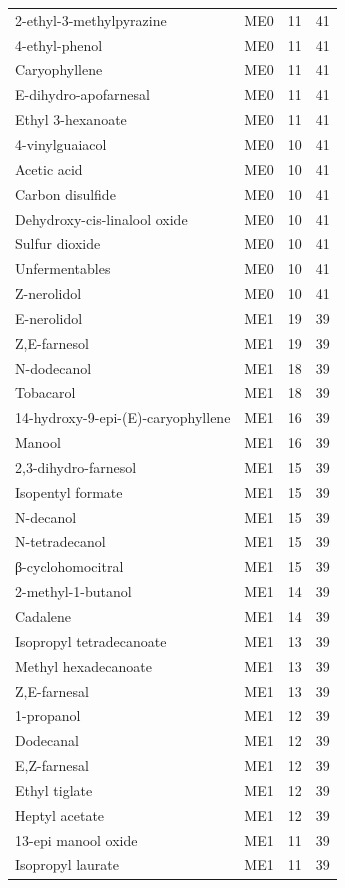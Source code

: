 {\begin{longtable}{lrrr}
2-ethyl-3-methylpyrazine & ME0 & 11 & 41 \\
4-ethyl-phenol & ME0 & 11 & 41 \\
Caryophyllene & ME0 & 11 & 41 \\
E-dihydro-apofarnesal & ME0 & 11 & 41 \\
Ethyl 3-hexanoate & ME0 & 11 & 41 \\
4-vinylguaiacol & ME0 & 10 & 41 \\
Acetic acid & ME0 & 10 & 41 \\
Carbon disulfide & ME0 & 10 & 41 \\
Dehydroxy-cis-linalool oxide & ME0 & 10 & 41 \\
Sulfur dioxide & ME0 & 10 & 41 \\
Unfermentables & ME0 & 10 & 41 \\
Z-nerolidol & ME0 & 10 & 41 \\
E-nerolidol & ME1 & 19 & 39 \\
Z,E-farnesol & ME1 & 19 & 39 \\
N-dodecanol & ME1 & 18 & 39 \\
Tobacarol & ME1 & 18 & 39 \\
14-hydroxy-9-epi-(E)-caryophyllene & ME1 & 16 & 39 \\
Manool & ME1 & 16 & 39 \\
2,3-dihydro-farnesol & ME1 & 15 & 39 \\
Isopentyl formate & ME1 & 15 & 39 \\
N-decanol & ME1 & 15 & 39 \\
N-tetradecanol & ME1 & 15 & 39 \\
β-cyclohomocitral & ME1 & 15 & 39 \\
2-methyl-1-butanol & ME1 & 14 & 39 \\
Cadalene & ME1 & 14 & 39 \\
Isopropyl tetradecanoate & ME1 & 13 & 39 \\
Methyl hexadecanoate & ME1 & 13 & 39 \\
Z,E-farnesal & ME1 & 13 & 39 \\
1-propanol & ME1 & 12 & 39 \\
Dodecanal & ME1 & 12 & 39 \\
E,Z-farnesal & ME1 & 12 & 39 \\
Ethyl tiglate & ME1 & 12 & 39 \\
Heptyl acetate & ME1 & 12 & 39 \\
13-epi manool oxide & ME1 & 11 & 39 \\
Isopropyl laurate & ME1 & 11 & 39 \\

\end{longtable}}
